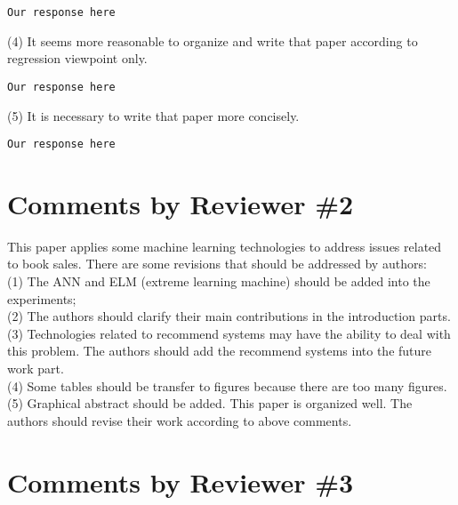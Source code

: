 \documentclass[preprint]{elsarticle}
\begin{document}
\begin{verbatim}
Our response here
\end{verbatim}

\noindent (4) It seems more reasonable to organize and write that paper according to regression viewpoint only.\\

\begin{verbatim}
Our response here
\end{verbatim}

\noindent (5) It is necessary to write that paper more concisely.\\

\begin{verbatim}
Our response here
\end{verbatim}





\section{Comments by Reviewer \#2}

\noindent This paper applies some machine learning technologies to address issues related to book sales. There are some revisions that should be addressed by authors:\\

\noindent (1) The ANN and ELM (extreme learning machine) should be added into the experiments;\\

\noindent (2) The authors should clarify their main contributions in the introduction parts.\\

\noindent (3) Technologies related to recommend systems may have the ability to deal with this problem. The authors should add the recommend systems into the future work part.\\

\noindent (4) Some tables should be transfer to figures because there are too many figures.\\

\noindent (5) Graphical abstract should be added.
This paper is organized well. The authors should revise their work according to above comments.\\

\section{Comments by Reviewer \#3}
\end{document}
